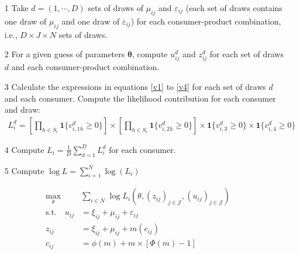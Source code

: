 \documentclass[12pt]{article}
\renewcommand*{\epsilon}{\varepsilon}
\begin{document}
\begin{itemize}
    \item[1] Take $d = (1, \cdots, D)$ sets of draws of $\mu_{ij}$ and $\epsilon_{ij}$ (each set of draws contains one draw of $\mu_{ij}$ and one draw of $\epsilon_{ij}$) for each consumer-product combination, i.e., $D\times J \times N$ sets of draws.
    \item[2] For a given guess of parameters $\bm{\theta}$, compute $u^d_{ij}$ and $z^d_{ij}$ for each set of draws $d$ and each consumer-product combination.
    \item[3] Calculate the expressions in equations \eqref{v1} to \eqref{v4} for each set of draws $d$ and each consumer. Compute the likelihood contribution for each consumer and draw:
    \begin{align*}
        L_i^d = \left[\prod_{h \in S_i} \bm{1}\{v^d_{i,1h} \geq 0\} \right] \times \left[\prod_{h \in S_i} \bm{1}\{v^d_{i,2h} \geq 0\} \right] \times  \bm{1}\{v^d_{i,3} \geq 0\}  \times  \bm{1}\{v^d_{i,4} \geq 0\}
    \end{align*}
    \item[4] Compute $L_i = \frac{1}{D}\sum_{d = 1}^D L_i^d$ for each consumer.
    \item[5] Compute $\log L = \sum_{i = 1}^N \log(L_i)$
\end{itemize}

\begin{align*}
    \max_{\theta}& \sum_{i\in \mathcal{N}} \log L_{i}(\theta,(z_{ij})_{j\in \mathcal{J}},(u_{ij})_{j\in \mathcal{J}})\nonumber\\
    \text{s.t.}\quad u_{i j} & =\xi_{i j}+\mu_{i j}+\varepsilon_{i j}\label{eq:mpec_formula}\\
    z_{i j}&=\xi_{i j}+\mu_{i j}+m\left(c_{i j}\right) \nonumber\\
    c_{i j}&=\phi(m)+m \times[\Phi(m)-1] \nonumber
\end{align*}



\end{document}

